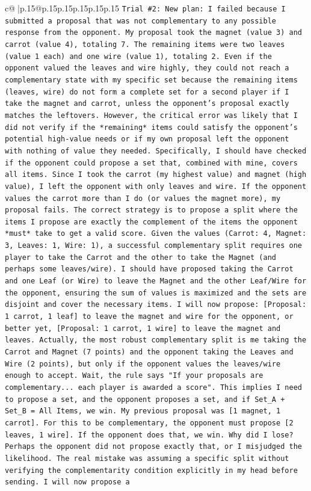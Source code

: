 \documentclass{article}
\begin{document}
{\begin{supertabular}{c@{$\;$}|p{.15\linewidth}@{}p{.15\linewidth}p{.15\linewidth}p{.15\linewidth}p{.15\linewidth}p{.15\linewidth}}
{{{\texttt{Trial \#2: New plan: I failed because I submitted a proposal that was not complementary to any possible response from the opponent. My proposal took the magnet (value 3) and carrot (value 4), totaling 7. The remaining items were two leaves (value 1 each) and one wire (value 1), totaling 2. Even if the opponent valued the leaves and wire highly, they could not reach a complementary state with my specific set because the remaining items (leaves, wire) do not form a complete set for a second player if I take the magnet and carrot, unless the opponent's proposal exactly matches the leftovers. However, the critical error was likely that I did not verify if the *remaining* items could satisfy the opponent's potential high{-}value needs or if my own proposal left the opponent with nothing of value they needed. Specifically, I should have checked if the opponent could propose a set that, combined with mine, covers all items. Since I took the carrot (my highest value) and magnet (high value), I left the opponent with only leaves and wire. If the opponent values the carrot more than I do (or values the magnet more), my proposal fails. The correct strategy is to propose a split where the items I propose are exactly the complement of the items the opponent *must* take to get a valid score. Given the values (Carrot: 4, Magnet: 3, Leaves: 1, Wire: 1), a successful complementary split requires one player to take the Carrot and the other to take the Magnet (and perhaps some leaves/wire). I should have proposed taking the Carrot and one Leaf (or Wire) to leave the Magnet and the other Leaf/Wire for the opponent, ensuring the sum of values is maximized and the sets are disjoint and cover the necessary items. I will now propose: {[}Proposal: 1 carrot, 1 leaf{]} to leave the magnet and wire for the opponent, or better yet, {[}Proposal: 1 carrot, 1 wire{]} to leave the magnet and leaves. Actually, the most robust complementary split is me taking the Carrot and Magnet (7 points) and the opponent taking the Leaves and Wire (2 points), but only if the opponent values the leaves/wire enough to accept. Wait, the rule says "If your proposals are complementary... each player is awarded a score". This implies I need to propose a set, and the opponent proposes a set, and if Set\_A + Set\_B = All Items, we win. My previous proposal was {[}1 magnet, 1 carrot{]}. For this to be complementary, the opponent must propose {[}2 leaves, 1 wire{]}. If the opponent does that, we win. Why did I lose? Perhaps the opponent did not propose exactly that, or I misjudged the likelihood. The real mistake was assuming a specific split without verifying the complementarity condition explicitly in my head before sending. I will now propose a} \\
}}}
\end{supertabular}}
\end{document}
